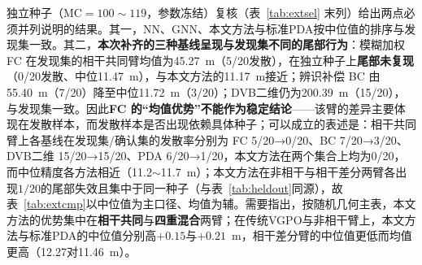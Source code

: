\documentclass[UTF8,a4paper,zihao=-4]{ctexart}
\begin{document}
独立种子（$\mathrm{MC}=100\sim119$，参数冻结）复核（表~\ref{tab:extsel} 末列）给出两点必须并列说明的结果。其一，NN、GNN、本文方法与标准PDA按中位值的排序与发现集一致。其二，\textbf{本次补齐的三种基线呈现与发现集不同的尾部行为}：模糊加权 FC 在发现集的相干共同臂均值为45.27~m（5/20发散），在独立种子上\textbf{尾部未复现}（0/20发散、中位11.47~m），与本文方法的11.17~m接近；辨识补偿 BC 由55.40~m（7/20）降至中位11.72~m（3/20）；DVB二维仍为200.39~m（15/20），与发现集一致。因此\textbf{FC 的“均值优势”不能作为稳定结论}——该臂的差异主要体现在发散样本，而发散样本是否出现依赖具体种子；可以成立的表述是：相干共同臂上各基线在发现集/确认集的发散率分别为 FC 5/20→0/20、BC 7/20→3/20、DVB二维 15/20→15/20、PDA 6/20→1/20，本文方法在两个集合上均为0/20，而中位精度各方法相近（11.2\(\sim\)11.7~m）；本文方法在非相干与相干差分两臂各出现$1/20$的尾部失效且集中于同一种子（与表~\ref{tab:heldout}同源），故表~\ref{tab:extcmp}以中位值为主口径、均值为辅。需要指出，按随机几何主表，本文方法的优势集中在\textbf{相干共同}与\textbf{四重混合}两臂；在传统VGPO与非相干臂上，本文方法与标准PDA的中位值分别高$+0.15$与$+0.21$~m，相干差分臂的中位值更低而均值更高（12.27对11.46~m）。
\end{document}
